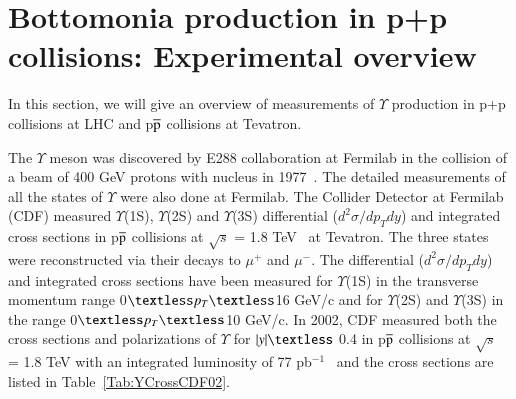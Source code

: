\section{Bottomonia production in p+p collisions: Experimental overview}


 In this section, we will give an overview of measurements of $\Upsilon$
production in p+p collisions at LHC and p$\overline{\rm p}$ collisions at Tevatron. 


The $\Upsilon$ meson was discovered by E288 collaboration at Fermilab in the collision of
a beam of 400 GeV protons with nucleus in 1977~\cite{PhysRevLett.39.252}.
The detailed measurements of all the states of $\Upsilon$ were also done at Fermilab.
The Collider Detector at Fermilab (CDF) measured $\Upsilon$(1S), $\Upsilon$(2S) and $\Upsilon$(3S) 
differential ($d^{2}\sigma/dp_{T}dy$) and integrated cross sections in p$\overline{\rm p}$
collisions at $\surd s$ = 1.8 TeV~\cite{CDF:1995gwi} at Tevatron.
The three states were reconstructed via their decays 
to $\mu^{+}$ and $\mu^{-}$. The differential ($d^{2}\sigma/dp_{T}dy$) and integrated
cross sections have been measured for  $\Upsilon$(1S) in the transverse momentum range
0$\textless p_{T} \textless$16 GeV/c and for $\Upsilon$(2S) and $\Upsilon$(3S)
in the range 0$\textless p_{T}\textless$10 GeV/c.
  In 2002, CDF measured both the cross sections and polarizations of $\Upsilon$
for $|y|\textless$ 0.4 in p$\overline{\rm p}$ collisions at $\surd s$ = 1.8 TeV with
an integrated luminosity of 77 pb$^{-1}$~\cite{CDF:2001fdy} and the cross sections are
listed in Table~\ref{Tab:YCrossCDF02}.





